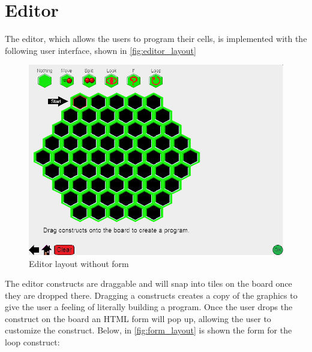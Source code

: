\section{Editor}
\label{sec:editor}
The editor, which allows the users to program their cells, is implemented with the following user interface, shown in \autoref{fig:editor_layout}

\begin{figure}[ht]
\includegraphics[width=\textwidth]{img/editor_layout.png}
\caption{Editor layout without form}
\label{fig:editor_layout}
\end{figure}

The editor constructs are draggable and will snap into tiles on the board once they are dropped there. Dragging a constructs creates a copy of the graphics to give the user a feeling of literally building a program. Once the user drops the construct on the board an HTML form will pop up, allowing the user to customize the construct. Below, in \autoref{fig:form_layout} is shown the form for the loop construct:

